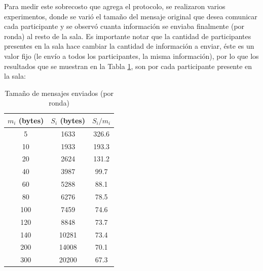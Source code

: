Para medir este sobrecosto que agrega el protocolo, se realizaron varios 
experimentos, donde se varió el tamaño del mensaje original que desea 
comunicar cada participante y se observó cuanta información se enviaba 
finalmente (por ronda) al resto de la sala. Es importante notar que la 
cantidad de participantes presentes en la sala hace cambiar la cantidad de 
información a enviar, éste es un valor fijo (le envío a todos los 
participantes, la misma información), por lo que los resultados que se 
muestran en la Tabla \ref{table:message_sizes_table}, son por cada 
participante presente en la sala:

\begin{table}[h!]
\centering
\begin{tabular}[h!]{|c|c|c|}
\hline
$m_i$ (bytes) & $S_i$ (bytes) & $S_i / m_i$ \\ \hline
5                                   & 1633                               & 326.6       \\ \hline
10                                  & 1933                               & 193.3       \\ \hline
20                                  & 2624                               & 131.2       \\ \hline
40                                  & 3987                               & 99.7        \\ \hline
60                                  & 5288                               & 88.1        \\ \hline
80                                  & 6276                               & 78.5        \\ \hline
100                                 & 7459                               & 74.6        \\ \hline
120                                 & 8848                               & 73.7        \\ \hline
140                                 & 10281                              & 73.4        \\ \hline
200                                 & 14008                              & 70.1        \\ \hline
300                                 & 20200                              & 67.3        \\ \hline
\end{tabular}
\caption{Tamaño de mensajes enviados (por ronda)}
\label{table:message_sizes_table}
\end{table}

